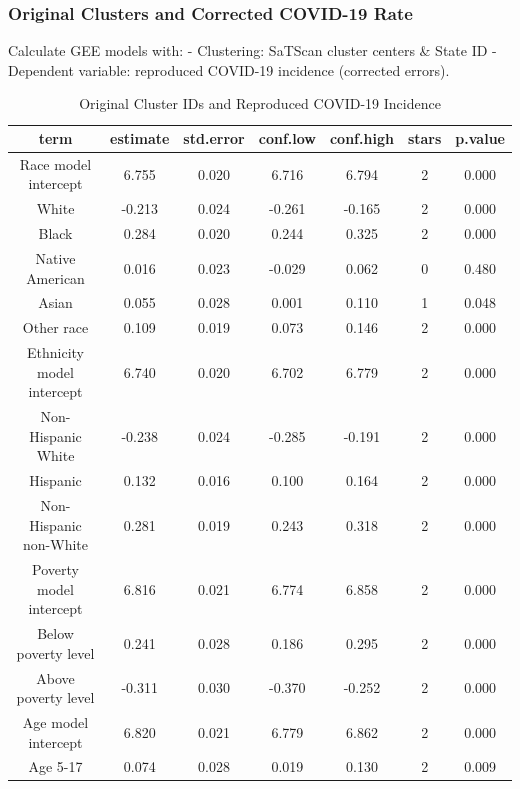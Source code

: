 \documentclass[
]{article}
\begin{document}
\hypertarget{original-clusters-and-corrected-covid-19-rate}{%
\subsubsection{Original Clusters and Corrected COVID-19
Rate}\label{original-clusters-and-corrected-covid-19-rate}}

Calculate GEE models with: - Clustering: SaTScan cluster centers \&
State ID - Dependent variable: reproduced COVID-19 incidence (corrected
errors).

\begin{table}

\caption{\label{tab:gee-original-clusters-reproduced-incidence}Original Cluster IDs and Reproduced COVID-19 Incidence}
\centering
\begin{tabular}[t]{c|c|c|c|c|c|c}
\hline
term & estimate & std.error & conf.low & conf.high & stars & p.value\\
\hline
Race model intercept & 6.755 & 0.020 & 6.716 & 6.794 & 2 & 0.000\\
\hline
White & -0.213 & 0.024 & -0.261 & -0.165 & 2 & 0.000\\
\hline
Black & 0.284 & 0.020 & 0.244 & 0.325 & 2 & 0.000\\
\hline
Native American & 0.016 & 0.023 & -0.029 & 0.062 & 0 & 0.480\\
\hline
Asian & 0.055 & 0.028 & 0.001 & 0.110 & 1 & 0.048\\
\hline
Other race & 0.109 & 0.019 & 0.073 & 0.146 & 2 & 0.000\\
\hline
Ethnicity model intercept & 6.740 & 0.020 & 6.702 & 6.779 & 2 & 0.000\\
\hline
Non-Hispanic White & -0.238 & 0.024 & -0.285 & -0.191 & 2 & 0.000\\
\hline
Hispanic & 0.132 & 0.016 & 0.100 & 0.164 & 2 & 0.000\\
\hline
Non-Hispanic non-White & 0.281 & 0.019 & 0.243 & 0.318 & 2 & 0.000\\
\hline
Poverty model intercept & 6.816 & 0.021 & 6.774 & 6.858 & 2 & 0.000\\
\hline
Below poverty level & 0.241 & 0.028 & 0.186 & 0.295 & 2 & 0.000\\
\hline
Above poverty level & -0.311 & 0.030 & -0.370 & -0.252 & 2 & 0.000\\
\hline
Age model intercept & 6.820 & 0.021 & 6.779 & 6.862 & 2 & 0.000\\
\hline
Age 5-17 & 0.074 & 0.028 & 0.019 & 0.130 & 2 & 0.009\\

\end{tabular}
\end{table}
\end{document}

